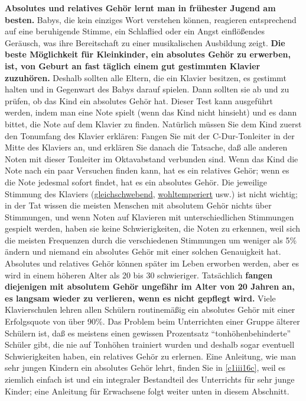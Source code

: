 \textbf{Absolutes und relatives Gehör lernt man in frühester Jugend am besten.}
Babys, die kein einziges Wort verstehen können, reagieren entsprechend auf eine beruhigende Stimme, ein Schlaflied oder ein Angst einflößendes Geräusch, was ihre Bereitschaft zu einer musikalischen Ausbildung zeigt.
\textbf{Die beste Möglichkeit für Kleinkinder, ein absolutes Gehör zu erwerben, ist, von Geburt an fast täglich einem gut gestimmten Klavier zuzuhören.}
Deshalb sollten alle Eltern, die ein Klavier besitzen, es gestimmt halten und in Gegenwart des Babys darauf spielen.
Dann sollten sie ab und zu prüfen, ob das Kind ein absolutes Gehör hat.
Dieser Test kann ausgeführt werden, indem man eine Note spielt (wenn das Kind nicht hinsieht) und es dann bittet, die Note auf dem Klavier zu finden.
Natürlich müssen Sie dem Kind zuerst den Tonumfang des Klavier erklären: Fangen Sie mit der C-Dur-Tonleiter in der Mitte des Klaviers an, und erklären Sie danach die Tatsache, daß alle anderen Noten mit dieser Tonleiter im Oktavabstand verbunden sind.
Wenn das Kind die Note nach ein paar Versuchen finden kann, hat es ein relatives Gehör; wenn es die Note jedesmal sofort findet, hat es ein absolutes Gehör.
Die jeweilige Stimmung des Klaviers (\hyperref[c2_6_et]{gleichschwebend}, \hyperref[c2_2_wtk2]{wohltemperiert} usw.) ist nicht wichtig; in der Tat wissen die meisten Menschen mit absolutem Gehör nichts über Stimmungen, und wenn Noten auf Klavieren mit unterschiedlichen Stimmungen gespielt werden, haben sie keine Schwierigkeiten, die Noten zu erkennen, weil sich die meisten Frequenzen durch die verschiedenen Stimmungen um weniger als 5\% ändern und niemand ein absolutes Gehör mit einer solchen Genauigkeit hat.
Absolutes und relatives Gehör können später im Leben erworben werden, aber es wird in einem höheren Alter als 20 bis 30 schwieriger.
Tatsächlich \textbf{fangen diejenigen mit absolutem Gehör ungefähr im Alter von 20 Jahren an, es langsam wieder zu verlieren, wenn es nicht gepflegt wird.}
Viele Klavierschulen lehren allen Schülern routinemäßig ein absolutes Gehör mit einer Erfolgsquote von über 90\%.
Das Problem beim Unterrichten einer Gruppe älterer Schülern ist, daß es meistens einen gewissen Prozentsatz \enquote{tonhöhenbehinderte} Schüler gibt, die nie auf Tonhöhen trainiert wurden und deshalb sogar eventuell Schwierigkeiten haben, ein relatives Gehör zu erlernen.
Eine Anleitung, wie man sehr jungen Kindern ein absolutes Gehör lehrt, finden Sie in \hyperref[c1iii16c]{\autoref{c1iii16c}}, weil es ziemlich einfach ist und ein integraler Bestandteil des Unterrichts für sehr junge Kinder; eine Anleitung für Erwachsene folgt weiter unten in diesem Abschnitt.

